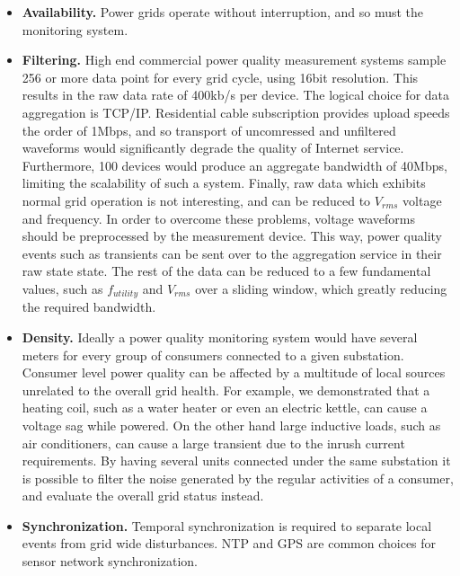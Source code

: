 \begin{itemize}
\item \textbf{Availability.} Power grids operate without interruption, and so must the monitoring system.

\item \textbf{Filtering.} High end commercial power quality measurement systems sample 256 or more data point for every grid cycle, using 16bit resolution. This results in the raw data rate of 400kb/s per device. The logical choice for data aggregation is TCP/IP. Residential cable  subscription provides upload speeds the order of 1Mbps, and so transport of uncomressed and unfiltered waveforms would significantly degrade the quality of Internet service. Furthermore, 100 devices would produce an aggregate bandwidth of 40Mbps, limiting the scalability of such a system. Finally, raw data which exhibits normal grid operation is not interesting, and can be reduced to $V_{rms}$ voltage and frequency. In order to overcome these problems, voltage waveforms should be preprocessed by the measurement device. This way, power quality events such as transients can be sent over to the aggregation service in their
raw state state. The rest of the data can be reduced to a few fundamental values, such as $f_{utility}$ and $V_{rms}$ over a sliding window, which greatly reducing the required bandwidth.

\item \textbf{Density.} Ideally a power quality monitoring system would have several meters for every group of consumers connected to a given
substation. Consumer level power quality can be affected by a multitude of local sources unrelated to the overall grid health. For example, we demonstrated that 
a heating coil, such as a water heater or even an electric kettle, can cause a voltage sag while powered. On the other hand large inductive loads, such as air conditioners, 
can cause a large transient due to the inrush current requirements. By having several units connected under the same substation it is possible to filter the noise generated
by the regular activities of a consumer, and evaluate the overall grid status instead.

\item \textbf{Synchronization.} Temporal synchronization is required to separate local events from grid wide disturbances.  NTP and GPS are common choices for sensor network synchronization. 

\end{itemize}

